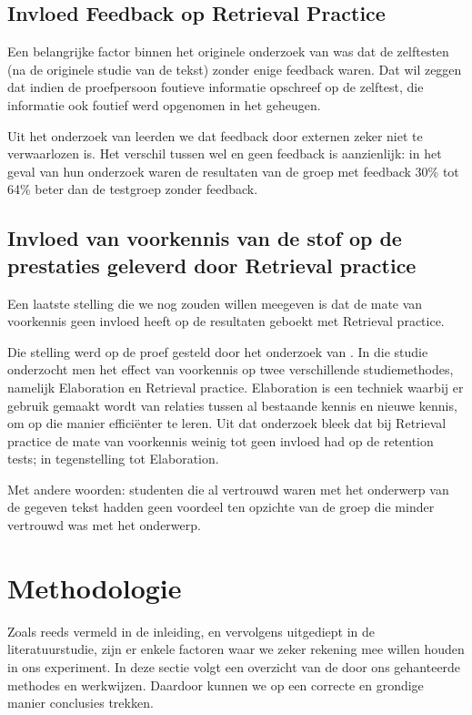 \documentclass{hogent-article}
\begin{document}
\subsection{Invloed Feedback op Retrieval Practice}

Een belangrijke factor binnen het originele onderzoek van \textcite{Roediger_2006} was dat de zelftesten (na de originele studie van de tekst) zonder enige feedback waren. Dat wil zeggen dat indien de proefpersoon foutieve informatie opschreef op de zelftest, die informatie ook foutief werd opgenomen in het geheugen.\\
\par
\noindent
Uit het onderzoek van \textcite{Roediger_2011} leerden we dat feedback door externen zeker niet te verwaarlozen is. Het verschil tussen wel en geen feedback is aanzienlijk: in het geval van hun onderzoek waren de resultaten van de groep met feedback 30\% tot 64\% beter dan de testgroep zonder feedback.

\subsection{Invloed van voorkennis van de stof op de prestaties geleverd door Retrieval practice}
\label{voorkennis}
Een laatste stelling die we nog zouden willen meegeven is dat de mate van voorkennis geen invloed heeft op de resultaten geboekt met Retrieval practice.\\
\par
\noindent
Die stelling werd op de proef gesteld door het onderzoek van \textcite{Xiaofeng_2016}. In die studie onderzocht men het effect van voorkennis op twee verschillende studiemethodes, namelijk Elaboration en Retrieval practice. Elaboration is een techniek waarbij er gebruik gemaakt wordt van relaties tussen al bestaande kennis en nieuwe kennis, om op die manier efficiënter te leren. Uit dat onderzoek bleek dat bij Retrieval practice de mate van voorkennis weinig tot geen invloed had op de retention tests; in tegenstelling tot Elaboration.\\
\par
\noindent
Met andere woorden: studenten die al vertrouwd waren met het onderwerp van de gegeven tekst hadden geen voordeel ten opzichte van de groep die minder vertrouwd was met het onderwerp.


\section{Methodologie}
\label{methodologie}
Zoals reeds vermeld in de inleiding, en vervolgens uitgediept in de literatuurstudie, zijn er enkele factoren waar we zeker rekening mee willen houden in ons experiment. In deze sectie volgt een overzicht van de door ons gehanteerde methodes en werkwijzen. Daardoor kunnen we op een correcte en grondige manier conclusies trekken.
\end{document}
